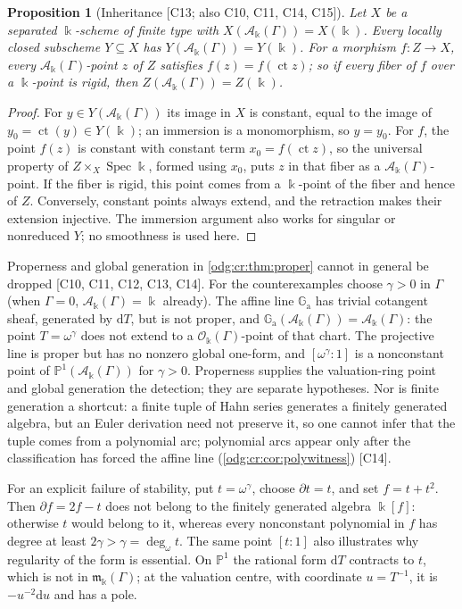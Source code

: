 \documentclass[11pt,oneside]{article}
\numberwithin{equation}{section}
\newtheorem{proposition}[proposition]{Proposition}
\theoremstyle{definition}
\theoremstyle{remark}
\newcommand{\ct}{\operatorname{ct}}
\newcommand{\ddeg}{\operatorname{deg}_{\omega}}
\newcommand{\src}[1]{\textup{\textsf{\small[#1]}}}
\newcommand{\crA}{\mathcal A_\Bbbk(\Gamma)}
\newcommand{\crO}{\mathcal O_\Bbbk(\Gamma)}
\newcommand{\crm}{\mathfrak m_\Bbbk(\Gamma)}
\newcommand{\Ga}{\mathbb G_{\mathrm a}}
\newcommand{\Spec}{\operatorname{Spec}}
\newcommand{\dif}{\mathrm d}
\begin{document}
\begin{proposition}[Inheritance \src{C13; also C10, C11, C14, C15}]\label{odg:cr:prop:inherit}
Let $X$ be a separated $\Bbbk$-scheme of finite type with $X(\crA)=X(\Bbbk)$. Every
locally closed subscheme $Y\subseteq X$ has $Y(\crA)=Y(\Bbbk)$. For a morphism
$f:Z\to X$, every $\crA$-point $z$ of $Z$ satisfies $f(z)=f(\ct z)$; so if every
fiber of $f$ over a $\Bbbk$-point is rigid, then $Z(\crA)=Z(\Bbbk)$.
\end{proposition}
\begin{proof}
For $y\in Y(\crA)$ its image in $X$ is constant, equal to the image of
$y_0=\ct(y)\in Y(\Bbbk)$; an immersion is a monomorphism, so $y=y_0$. For $f$, the
point $f(z)$ is constant with constant term $x_0=f(\ct z)$, so the
universal property of $Z\times_X\Spec\Bbbk$, formed using $x_0$, puts
$z$ in that fiber as a $\crA$-point. If the fiber is rigid, this point
comes from a $\Bbbk$-point of the fiber and hence of $Z$. Conversely,
constant points always extend, and the retraction makes their extension
injective. The immersion argument also works for singular or nonreduced
$Y$; no smoothness is used here.
\end{proof}

Properness and global generation in \cref{odg:cr:thm:proper} cannot in general
be dropped \src{C10, C11, C12, C13, C14}. For the counterexamples choose
$\gamma>0$ in $\Gamma$ (when $\Gamma=0$, $\crA=\Bbbk$ already).
The affine line $\Ga$ has trivial cotangent sheaf,
generated by $\dif T$, but is not proper, and $\Ga(\crA)=\crA$: the point
$T=\omega^\gamma$ does not extend to a $\crO$-point of that chart. The projective
line is proper but has no nonzero global one-form, and $[\omega^\gamma:1]$ is a
nonconstant point of $\mathbb P^1(\crA)$ for $\gamma>0$. Properness supplies the
valuation-ring point and global generation the detection; they are separate
hypotheses. Nor is finite generation a shortcut: a finite tuple of Hahn series
generates a finitely generated algebra, but an Euler derivation need not preserve
it, so one cannot infer that the tuple comes from a polynomial arc; polynomial
arcs appear only after the classification has forced the affine line
(\cref{odg:cr:cor:polywitness}) \src{C14}.

For an explicit failure of stability, put $t=\omega^\gamma$, choose
$\partial t=t$, and set $f=t+t^2$. Then $\partial f=2f-t$ does not belong
to the finitely generated algebra $\Bbbk[f]$: otherwise $t$ would belong
to it, whereas every nonconstant polynomial in $f$ has degree at least
$2\gamma>\gamma=\ddeg t$. The same point $[t:1]$ also illustrates why
regularity of the form is essential. On $\mathbb P^1$ the rational form
$\dif T$ contracts to $t$, which is not in $\crm$; at the valuation
centre, with coordinate $u=T^{-1}$, it is $-u^{-2}\dif u$ and has a pole.
\end{document}
